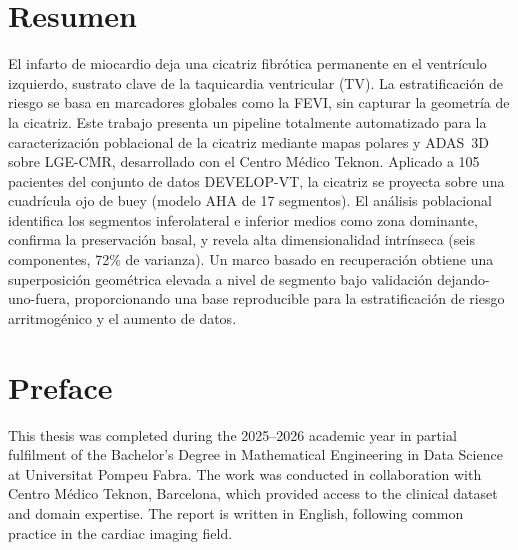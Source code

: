 \section*{\Large \sffamily Resumen}

{\fontsize{11}{13.5}\selectfont
\noindent
El infarto de miocardio deja una cicatriz fibr\'{o}tica permanente en el ventr\'{i}culo izquierdo,
sustrato clave de la taquicardia ventricular (TV). La estratificaci\'{o}n de riesgo se basa en
marcadores globales como la FEVI, sin capturar la geometr\'{i}a de la cicatriz. Este trabajo
presenta un pipeline totalmente automatizado para la caracterizaci\'{o}n poblacional de la
cicatriz mediante mapas polares y ADAS~3D sobre LGE-CMR, desarrollado con el Centro M\'{e}dico Teknon.
Aplicado a 105 pacientes del conjunto de datos DEVELOP-VT, la cicatriz se proyecta sobre
una cuadr\'{i}cula ojo de buey (modelo AHA de 17 segmentos). El an\'{a}lisis poblacional identifica
los segmentos inferolateral e inferior medios como zona dominante, confirma la preservaci\'{o}n
basal, y revela alta dimensionalidad intr\'{i}nseca (seis componentes, 72\% de varianza). Un
marco basado en recuperaci\'{o}n obtiene una superposici\'{o}n geom\'{e}trica elevada a nivel de
segmento bajo validaci\'{o}n dejando-uno-fuera, proporcionando una base reproducible para
la estratificaci\'{o}n de riesgo arritmog\'{e}nico y el aumento de datos.
}

\vspace{1.0em}

\cleardoublepage

\section*{\Large \sffamily Preface}

This thesis was completed during the 2025--2026 academic year in partial fulfilment of the
Bachelor's Degree in Mathematical Engineering in Data Science at Universitat Pompeu
Fabra. The work was conducted in collaboration with Centro M\'{e}dico Teknon, Barcelona,
which provided access to the clinical dataset and domain expertise. The report is written
in English, following common practice in the cardiac imaging field.

